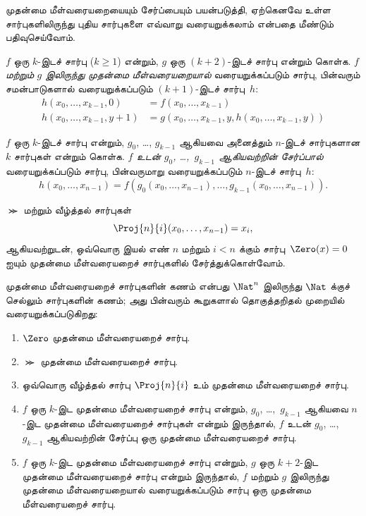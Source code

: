\documentclass[../../../include/open-logic-section]{subfiles}
\begin{document}


முதன்மை மீள்வரையறையையும் சேர்ப்பையும் பயன்படுத்தி, ஏற்கெனவே உள்ள
சார்புகளிலிருந்து புதிய சார்புகளை எவ்வாறு வரையறுக்கலாம் என்பதை மீண்டும்
பதிவுசெய்வோம்.

\begin{defn}
   $f$ ஒரு $k$-இடச் சார்பு
  ($k\ge 1$) என்றும், $g$ ஒரு $(k+2)$-இடச் சார்பு என்றும் கொள்க.
  \emph{$f$ மற்றும் $g$ இலிருந்து முதன்மை மீள்வரையறையால்}
  வரையறுக்கப்படும் சார்பு, பின்வரும் சமன்பாடுகளால் வரையறுக்கப்படும்
  $(k+1)$-இடச் சார்பு~$h$:
  \begin{align*}
    h(x_0,\dots,x_{k-1},0) & =  f(x_0,\dots,x_{k-1}) \\
    h(x_0,\dots,x_{k-1},y+1) & = g(x_0,\dots,x_{k-1}, y, h(x_0,\dots,x_{k-1}, y))
  \end{align*}
\end{defn}

\begin{defn}
   $f$ ஒரு $k$-இடச் சார்பு என்றும்,
  $g_0$, \dots, $g_{k-1}$ ஆகியவை அனைத்தும் $n$-இடச் சார்புகளான
  $k$ சார்புகள் என்றும் கொள்க.
  \emph{$f$ உடன் $g_0$, \dots,~$g_{k-1}$ ஆகியவற்றின் சேர்ப்பால்}
  வரையறுக்கப்படும் சார்பு, பின்வருமாறு வரையறுக்கப்படும் $n$-இடச்
  சார்பு~$h$:
  \[
  h(x_0, \dots, x_{n-1}) =
  f(g_0(x_0, \dots, x_{n-1}), \dots, g_{k-1}(x_0, \dots, x_{n-1})).
  \]
\end{defn}

$\Succ$ மற்றும் வீழ்த்தல் சார்புகள்
\[
\Proj{n}{i}(x_0,\dots,x_{n-1}) = x_i,
\]
ஆகியவற்றுடன், ஒவ்வொரு இயல் எண் $n$ மற்றும் $i < n$ க்கும்
சார்பு~$\Zero(x) = 0$ ஐயும் முதன்மை மீள்வரையறைச் சார்புகளில்
சேர்த்துக்கொள்வோம்.

\begin{defn}
  முதன்மை மீள்வரையறைச் சார்புகளின் கணம் என்பது
  $\Nat^n$ இலிருந்து $\Nat$ க்குச் செல்லும் சார்புகளின் கணம்;
  அது பின்வரும் கூறுகளால் தொகுத்தறிதல் முறையில் வரையறுக்கப்படுகிறது:
  \begin{enumerate}
  \item $\Zero$ முதன்மை மீள்வரையறைச் சார்பு.
  \item $\Succ$ முதன்மை மீள்வரையறைச் சார்பு.
  \item ஒவ்வொரு வீழ்த்தல் சார்பு $\Proj{n}{i}$ உம் முதன்மை
    மீள்வரையறைச் சார்பு.
  \item $f$ ஒரு $k$-இட முதன்மை மீள்வரையறைச் சார்பு என்றும்,
    $g_0$, \dots,~$g_{k-1}$ ஆகியவை $n$-இட முதன்மை
    மீள்வரையறைச் சார்புகள் என்றும் இருந்தால், $f$ உடன் $g_0$,
    \dots,~$g_{k-1}$ ஆகியவற்றின் சேர்ப்பு ஒரு முதன்மை
    மீள்வரையறைச் சார்பு.
  \item $f$ ஒரு $k$-இட முதன்மை மீள்வரையறைச் சார்பு என்றும்,
    $g$ ஒரு $k+2$-இட முதன்மை மீள்வரையறைச் சார்பு என்றும்
    இருந்தால், $f$ மற்றும் $g$ இலிருந்து முதன்மை மீள்வரையறையால்
    வரையறுக்கப்படும் சார்பு ஒரு முதன்மை மீள்வரையறைச் சார்பு.
\end{enumerate}
\end{defn}
\end{document}
